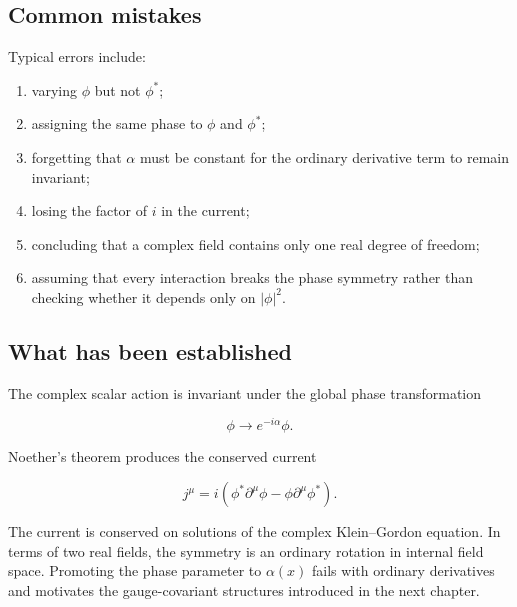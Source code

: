 \subsection{Common mistakes}

Typical errors include:

\begin{enumerate}
    \item varying \(\phi\) but not \(\phi^{*}\);
    \item assigning the same phase to \(\phi\) and \(\phi^{*}\);
    \item forgetting that \(\alpha\) must be constant for the ordinary derivative term to remain invariant;
    \item losing the factor of \(i\) in the current;
    \item concluding that a complex field contains only one real degree of freedom;
    \item assuming that every interaction breaks the phase symmetry rather than checking whether it depends only on \(|\phi|^{2}\).
\end{enumerate}

\subsection{What has been established}

The complex scalar action is invariant under the global phase transformation

\[
\phi
\longrightarrow
e^{-i\alpha}\phi.
\]

Noether's theorem produces the conserved current

\[
j^{\mu}
=
i
\left(
\phi^{*}\partial^{\mu}\phi
-
\phi\partial^{\mu}\phi^{*}
\right).
\]

The current is conserved on solutions of the complex Klein--Gordon equation. In terms of two real fields, the symmetry is an ordinary rotation in internal field space. Promoting the phase parameter to \(\alpha(x)\) fails with ordinary derivatives and motivates the gauge-covariant structures introduced in the next chapter.
